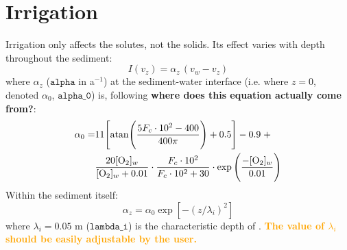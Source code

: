 \documentclass[a4paper]{article}
\newcommand{\code}[1]{\texttt{#1}}
\newcommand{\wtf}[1]{\textcolor{Cerulean}{\textbf{#1}}}
\newcommand{\codenote}[1]{\textcolor{Orange}{\textbf{#1}}}
\begin{document}
\section{Irrigation}\label{sx:irrigation}

Irrigation only affects the solutes, not the solids. Its effect varies with depth throughout the sediment:
\begin{equation}
I(v_z) = \alpha_z \, (v_w - v_z)
\end{equation}
where $\alpha_z$ ($\code{alpha}$ in a$^{-1}$) at the sediment-water interface (i.e. where $z = 0$, denoted $\alpha_0$, $\code{alpha\_0}$) is, following \wtf{where does this equation actually come from?}:
\begin{equation}
\begin{split}
\alpha_0 = & 11 \Bigg[ \mathrm{atan} \Bigg( \frac{5 F_c \cdot 10^2 - 400}{400 \pi} \Bigg) + 0.5 \Bigg] - 0.9 \; + \\
& \frac{20 [\ce{O2}]_w}{[\ce{O2}]_w + 0.01} \cdot \frac{F_c \cdot 10^2}{F_c \cdot 10^2 + 30} \cdot \exp \Bigg(\frac{-[\ce{O2}]_w}{0.01}\Bigg)
\end{split}
\end{equation}
Within the sediment itself:
\begin{equation}
\alpha_z = \alpha_0 \exp [-(z/\lambda_i)^2]
\end{equation}
where $\lambda_i = 0.05$ m ($\code{lambda\_i}$) is the characteristic depth of \citet{archer_model_2002}. \codenote{The value of $\lambda_i$ should be easily adjustable by the user.}



\end{document}
